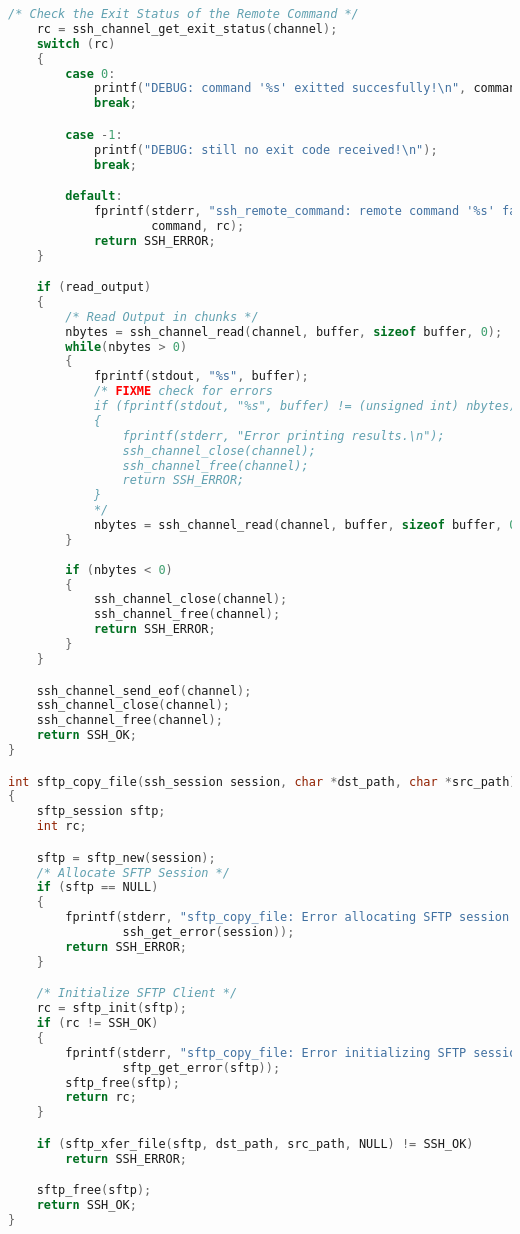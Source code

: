\begin{lstlisting}[language=C,caption={Signature and schematic implementation of remote execution methods.},label={code:libssh}]
    /* Check the Exit Status of the Remote Command */
    rc = ssh_channel_get_exit_status(channel);
    switch (rc) 
    {
        case 0:
            printf("DEBUG: command '%s' exitted succesfully!\n", command);
            break;

        case -1:
            printf("DEBUG: still no exit code received!\n");
            break;

        default:
            fprintf(stderr, "ssh_remote_command: remote command '%s' failed w/ exit status %i\n",
                    command, rc);
            return SSH_ERROR;
    }

    if (read_output)
    {
        /* Read Output in chunks */
        nbytes = ssh_channel_read(channel, buffer, sizeof buffer, 0);
        while(nbytes > 0)
        {
            fprintf(stdout, "%s", buffer);
            /* FIXME check for errors
            if (fprintf(stdout, "%s", buffer) != (unsigned int) nbytes)
            {
                fprintf(stderr, "Error printing results.\n");
                ssh_channel_close(channel);
                ssh_channel_free(channel);
                return SSH_ERROR;
            }
            */
            nbytes = ssh_channel_read(channel, buffer, sizeof buffer, 0);
        }
        
        if (nbytes < 0)
        {
            ssh_channel_close(channel);
            ssh_channel_free(channel);
            return SSH_ERROR;
        }
    }

    ssh_channel_send_eof(channel);
    ssh_channel_close(channel);
    ssh_channel_free(channel);
    return SSH_OK;
}

int sftp_copy_file(ssh_session session, char *dst_path, char *src_path)
{
    sftp_session sftp;
    int rc;

    sftp = sftp_new(session);
    /* Allocate SFTP Session */
    if (sftp == NULL)
    {
        fprintf(stderr, "sftp_copy_file: Error allocating SFTP session: %s\n",
                ssh_get_error(session));
        return SSH_ERROR;
    }

    /* Initialize SFTP Client */
    rc = sftp_init(sftp);
    if (rc != SSH_OK)
    {
        fprintf(stderr, "sftp_copy_file: Error initializing SFTP session: %d\n",
                sftp_get_error(sftp));
        sftp_free(sftp);
        return rc;
    }

    if (sftp_xfer_file(sftp, dst_path, src_path, NULL) != SSH_OK)
        return SSH_ERROR;

    sftp_free(sftp);
    return SSH_OK;
}


\end{lstlisting}

